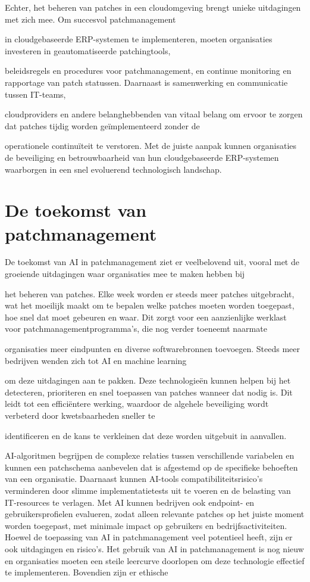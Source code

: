 Echter, het beheren van patches in een cloudomgeving brengt unieke uitdagingen met zich mee. Om succesvol patchmanagement

in cloudgebaseerde ERP-systemen te implementeren, moeten organisaties investeren in geautomatiseerde patchingtools, 

beleidsregels en procedures voor patchmanagement, en continue monitoring en rapportage van patch statussen. Daarnaast is samenwerking en communicatie tussen IT-teams, 

cloudproviders en andere belanghebbenden van vitaal belang om ervoor te zorgen dat patches tijdig worden geïmplementeerd zonder de 

operationele continuïteit te verstoren. Met de juiste aanpak kunnen organisaties de beveiliging en betrouwbaarheid van hun cloudgebaseerde ERP-systemen waarborgen in een snel evoluerend technologisch landschap.


\section{De toekomst van patchmanagement}
De toekomst van AI in patchmanagement ziet er veelbelovend uit, vooral met de groeiende uitdagingen waar organisaties mee te maken hebben bij

het beheren van patches. Elke week worden er steeds meer patches uitgebracht, wat het moeilijk maakt om te bepalen welke patches moeten worden toegepast, hoe snel dat moet gebeuren en waar. Dit zorgt voor een aanzienlijke werklast voor patchmanagementprogramma's, die nog verder toeneemt naarmate

organisaties meer eindpunten en diverse softwarebronnen toevoegen. Steeds meer bedrijven wenden zich tot AI en machine learning

om deze uitdagingen aan te pakken. Deze technologieën kunnen helpen bij het detecteren, prioriteren en snel toepassen van patches wanneer dat nodig is. Dit leidt tot een efficiëntere werking, waardoor de algehele beveiliging wordt verbeterd door kwetsbaarheden sneller te 

identificeren en de kans te verkleinen dat deze worden uitgebuit in aanvallen.

AI-algoritmen begrijpen de complexe relaties tussen verschillende variabelen en kunnen een patchschema aanbevelen dat is afgestemd op de specifieke behoeften van een organisatie. Daarnaast kunnen AI-tools compatibiliteitsrisico's 
verminderen door slimme implementatietests uit te voeren en de belasting van IT-resources te verlagen. Met AI kunnen bedrijven ook
 endpoint- en gebruikersprofielen evalueren, zodat alleen relevante patches op het juiste moment worden toegepast, met minimale impact op gebruikers en bedrijfsactiviteiten. Hoewel de toepassing van AI in patchmanagement veel potentieel heeft, zijn er 
 ook uitdagingen en risico's. Het gebruik van AI in patchmanagement is nog nieuw en organisaties moeten een steile leercurve doorlopen om deze technologie effectief te implementeren. Bovendien zijn er ethische 

